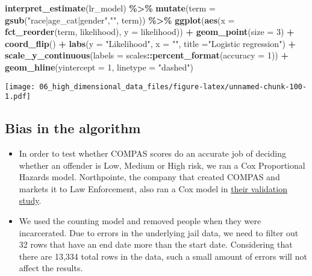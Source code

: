 \documentclass[
]{book}
\newenvironment{Shaded}{\begin{snugshade}}{\end{snugshade}}
\newcommand{\DataTypeTok}[1]{\textcolor[rgb]{0.13,0.29,0.53}{#1}}
\newcommand{\DecValTok}[1]{\textcolor[rgb]{0.00,0.00,0.81}{#1}}
\newcommand{\KeywordTok}[1]{\textcolor[rgb]{0.13,0.29,0.53}{\textbf{#1}}}
\newcommand{\NormalTok}[1]{#1}
\newcommand{\OperatorTok}[1]{\textcolor[rgb]{0.81,0.36,0.00}{\textbf{#1}}}
\newcommand{\StringTok}[1]{\textcolor[rgb]{0.31,0.60,0.02}{#1}}
\begin{document}
\begin{Shaded}
\begin{Highlighting}[]
\KeywordTok{interpret\_estimate}\NormalTok{(lr\_model) }\OperatorTok{\%\textgreater{}\%}
\StringTok{    }\KeywordTok{mutate}\NormalTok{(}\DataTypeTok{term =} \KeywordTok{gsub}\NormalTok{(}\StringTok{"race|age\_cat|gender"}\NormalTok{,}\StringTok{""}\NormalTok{, term)) }\OperatorTok{\%\textgreater{}\%}\StringTok{ }
\StringTok{    }\KeywordTok{ggplot}\NormalTok{(}\KeywordTok{aes}\NormalTok{(}\DataTypeTok{x =} \KeywordTok{fct\_reorder}\NormalTok{(term, likelihood), }\DataTypeTok{y =}\NormalTok{ likelihood)) }\OperatorTok{+}
\StringTok{        }\KeywordTok{geom\_point}\NormalTok{(}\DataTypeTok{size =} \DecValTok{3}\NormalTok{) }\OperatorTok{+}
\StringTok{        }\KeywordTok{coord\_flip}\NormalTok{() }\OperatorTok{+}
\StringTok{        }\KeywordTok{labs}\NormalTok{(}\DataTypeTok{y =} \StringTok{"Likelihood"}\NormalTok{, }\DataTypeTok{x =} \StringTok{""}\NormalTok{,}
            \DataTypeTok{title =}\StringTok{"Logistic regression"}\NormalTok{) }\OperatorTok{+}
\StringTok{        }\KeywordTok{scale\_y\_continuous}\NormalTok{(}\DataTypeTok{labels =}\NormalTok{ scales}\OperatorTok{::}\KeywordTok{percent\_format}\NormalTok{(}\DataTypeTok{accuracy =} \DecValTok{1}\NormalTok{)) }\OperatorTok{+}
\StringTok{        }\KeywordTok{geom\_hline}\NormalTok{(}\DataTypeTok{yintercept =} \DecValTok{1}\NormalTok{, }\DataTypeTok{linetype =} \StringTok{"dashed"}\NormalTok{)}
\end{Highlighting}
\end{Shaded}

\texttt{[image: 06\_high\_dimensional\_data\_files/figure-latex/unnamed-chunk-100-1.pdf]}

\hypertarget{bias-in-the-algorithm}{%
\subsection{Bias in the algorithm}\label{bias-in-the-algorithm}}

\begin{itemize}
\item
  In order to test whether COMPAS scores do an accurate job of deciding whether an offender is Low, Medium or High risk, we ran a Cox Proportional Hazards model. Northpointe, the company that created COMPAS and markets it to Law Enforcement, also ran a Cox model in \href{https://journals.sagepub.com/doi/abs/10.1177/0093854808326545}{their validation study}.
\item
  We used the counting model and removed people when they were incarcerated. Due to errors in the underlying jail data, we need to filter out 32 rows that have an end date more than the start date. Considering that there are 13,334 total rows in the data, such a small amount of errors will not affect the results.
\end{itemize}
\end{document}
